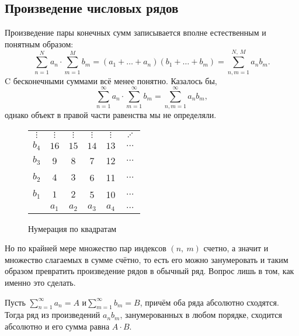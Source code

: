 \documentclass[a4paper, 12pt]{article}
\begin{document}
\subsection{Произведение числовых рядов}
	Произведение пары конечных сумм записывается вполне естественным и понятным образом:
	\[
	\sum\limits_{n=1}^{N}a_n \cdot \sum\limits_{m=1}^{M}b_m = (a_1 + \dots + a_n) (b_1 + \dots + b_m)=\sum\limits_{n,m=1}^{N,\  M}a_nb_m.
	\]
	C бесконечными суммами всё менее понятно. Казалось бы,
	\[
	\sum\limits_{n=1}^{\infty}a_n \cdot \sum\limits_{m=1}^{\infty}b_m = \sum\limits_{n, m=1}^{\infty}a_nb_m,
	\] однако объект в правой части равенства мы не определяли.

	\medskip
	
	\begin{wrapfigure}{l}{0.3\linewidth}
		\begin{tabular}[t]{c|ccccc}
			$\vdots$ & $\vdots$ & $\vdots$ & $\vdots$ &$\vdots$& $\iddots$ \\
			$b_4$ & $16$ & $15$ & $14$ & $13$ &$\dots$\\
			$b_3$ & 9 & 8 & 7 &  12&$\dots$ \\
			$b_2$ & $4$ & $3$ & 6 & 11&$\dots$ \\
			$b_1$ & $1$ & $2$ & 5 & 10& $\dots $\\
			\hline
			& $a_1$ & $a_2$ & $a_3$ & $a_4$ &$\dots$ 
		\end{tabular}
		\caption{Нумерация по квадратам}
		\vspace{-50pt}
	\end{wrapfigure}
	Но по крайней мере множество пар индексов $(n,\ m)$ счетно, а значит и множество слагаемых в сумме счётно, то есть его можно занумеровать и таким образом превратить произведение рядов в обычный ряд. Вопрос лишь в том, как именно это сделать.
	
	\begin{Theorem}
		Пусть $\sum\limits_{n=1}^{\infty}a_n =A $ и$ \sum\limits_{m=1}^{\infty}b_m = B$, причём оба ряда абсолютно сходятся. Тогда ряд из произведений $a_nb_m$, занумерованных в любом порядке, сходится абсолютно и его сумма равна $A\cdot B$.
	\end{Theorem} 
	
\end{document}
